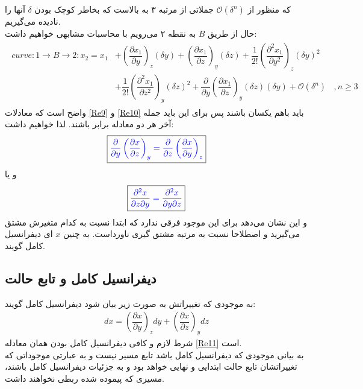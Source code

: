\documentclass[12pt,a4paper]{article}							   %
\begin{document}
که منظور از
$ \mathcal{O}(\delta ^{n}) $
جملاتی از مرتبه ۳ به بالاست که بخاطر کوچک بودن
$ \delta $
آنها را نادیده می‌گیریم.
\\
حال از طریق
$ B $
به نقطه ۲ می‌رویم با محاسبات مشابهی خواهیم داشت:
\begin{align}\label{Re10}
\begin{split}
curve:1\rightarrow B\rightarrow 2 : x_{2}=x_{1}&+\left( \dfrac{\partial x_{1}}{\partial y}\right)_{z}(\delta y)+\left( \dfrac{\partial x_{1}}{\partial z}\right)_{y}(\delta z)+\dfrac{1}{2!}\left( \dfrac{\partial^{2}x_{1}}{\partial y^{2}}\right)_{z}(\delta y)^{2}\\											    										   &+\dfrac{1}{2!}\left(\dfrac{\partial^{2}x_{1}}{\partial z^{2}}\right)_{y}(\delta z)^{2}+					\dfrac{\partial}{\partial y}\left( \dfrac{\partial x_{1}}{\partial z}\right)_{y}(\delta z)(\delta y)+\mathcal{O}(\delta ^{n})~~~~,n\geq 3
\end{split}
\end{align}
واضح است که معادلات
\eqref{Re9}
و
\eqref{Re10}
باید باهم یکسان باشند پس برای این باید جمله آخر هر دو معادله برابر باشند. لذا خواهیم داشت:
\begin{align*}
\boxed{\textcolor{blue}{\dfrac{\partial}{\partial y}\left( \dfrac{\partial x}{\partial z}\right)_{y}=\dfrac{\partial}{\partial z}\left( \dfrac{\partial x}{\partial y}\right)_{z}}}
\end{align*}
و یا
\begin{align}\label{Re11}
\boxed{\textcolor{blue}{ \dfrac{\partial ^{2} x}{\partial z \partial y}= \dfrac{\partial ^{2} x}{\partial y \partial z}}}
\end{align}
و این نشان می‌دهد برای این موجود فرقی ندارد که ابتدا نسبت به کدام متغیرش مشتق می‌گیرید و اصطلاحا نسبت به مرتبه مشتق گیری ناورداست. به چنین
$ x $
ای
دیفرانسیل کامل گویند.
\\
\subsection{دیفرانسیل کامل و تابع حالت
}
به موجودی که تغییراتش به صورت زیر بیان شود دیفرانسیل کامل گویند:
\begin{align}
dx=\left(\dfrac{\partial{x}}{\partial{y}}\right)_{z}dy+\left( \dfrac{\partial{x}}{\partial{z}}\right)_{y}dz
\end{align}
شرط لازم و کافی دیفرانسیل کامل بودن همان معادله
\eqref{Re11}
است.
\\
به بیانی موجودی که دیفرانسیل کامل باشد تابع مسیر نیست و به عبارتی موجوداتی که دیفرانسیل کامل باشند‫‪،‬‬ تغییراتشان تابع حالت ابتدایی و نهایی خواهد بود و به جزئیات مسیری که پیموده شده ربطی نخواهند داشت.
\\
\end{document}
